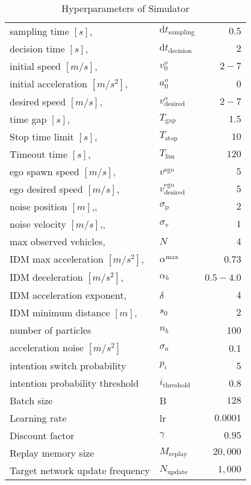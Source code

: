 	\begin{table}[!bt]
		\renewcommand{\arraystretch}{1.2}
		\caption{Hyperparameters of Simulator}
		\label{tab:hyperparameters}
		\centering
		\begin{tabular}{l l r}
			\toprule
			sampling time $[s]$, & $\mathrm{d}t_\mathrm{sampling}$ & $0.5$\\
			decision time $[s]$, & $\mathrm{d}t_\mathrm{decision}$ & $2$\\
			initial speed $[m/s]$, & $v^o_0 $ & $2-7$\\
			initial acceleration $[m/s^2]$, & $a^o_0 $ & $0$\\
			desired speed $[m/s]$, & $v_\mathrm{desired}^o$ & $2-7$\\
			time gap $[s]$, & $T_\mathrm{gap}$ & $1.5$\\
			Stop time limit $[s]$, & $T_\mathrm{stop}$ & $10$\\
			Timeout time $[s]$, & $T_\mathrm{lim}$ & $120$\\
			ego spawn speed $[m/s]$, & $v^\mathrm{ego}$ & $5$\\
			ego desired speed $[m/s]$, & $v^\mathrm{ego}_\mathrm{desired}$ & $5$\\
			noise position $[m]$,, & $\sigma_\mathrm{p}$ & $2$\\ 
			noise velocity $[m/s]$,, & $\sigma_\mathrm{v}$ & $1$\\ 
			max observed vehicles, & $N$ & $4$\\ 
	
			\midrule
			IDM max acceleration $[m/s^2]$, & $\alpha^{\mathrm{max}} $ & $0.73$\\
			IDM deceleration $[m/s^2]$, & $\alpha_b $ & $0.5 - 4.0$\\
			IDM acceleration exponent, & $\delta$ & $4$\\
			IDM minimum distance $[m]$, & $s_0$ & $2$\\
			\midrule
			
			number of particles & $n_b$ & 100\\
			acceleration noise $[m/s^2]$ & $\sigma_a$ & 0.1 \\
			intention switch probability & $p_i$ & 5 \\
			intention probability threshold & $i_\text{threshold}$ & 0.8 \\
			\midrule
			
			Batch size & B & $128$ \\
			Learning rate & lr & $0.0001$ \\
			Discount factor & $\gamma$ & $0.95$\\
			Replay memory size & $M_\mathrm{replay}$ & $20{,}000$\\
			Target network update frequency & $N_\mathrm{update}$ & $1{,}000$\\
	

\end{tabular}
\end{table}
